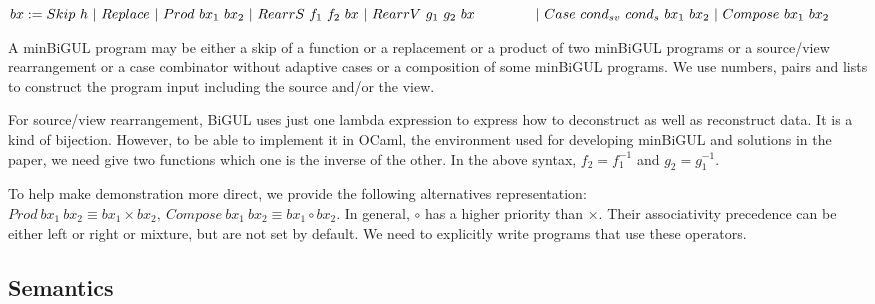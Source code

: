     $bx := Skip \ h \
        | \ Replace \
        | \ Prod \ bx_1 \ bx_2 \
        | \ RearrS \ f_1 \ f_2 \ bx \
        | \ RearrV \ g_1 \ g_2 \ bx \\
    \qtabs{2} | \ Case \ cond_{sv} \ cond_{s} \ bx_1 \ bx_2 \
        | \ Compose \ bx_1 \ bx_2$

A minBiGUL program may be either a skip of a function or a replacement or a product of two minBiGUL programs or a source/view rearrangement or a case combinator without adaptive cases or a composition of some minBiGUL programs. We use numbers, pairs and lists to construct the program input including the source and/or the view.

For source/view rearrangement, BiGUL uses just one lambda expression to express how to deconstruct as well as reconstruct data. It is a kind of bijection. However, to be able to implement it in OCaml, the environment used for developing minBiGUL and solutions in the paper, we need give two functions which one is the inverse of the other. In the above syntax, $f_2 = f_1^{-1}$ and $g_2 = g_1^{-1}$.

To help make demonstration more direct, we provide the following alternatives representation: $Prod \ bx_1 \ bx_2 \equiv bx_1 \times bx_2, \ Compose \ bx_1 \ bx_2 \equiv bx_1 \circ bx_2$. In general, $\circ$ has a higher priority than $\times$. Their associativity precedence can be either left or right or mixture, but are not set by default. We need to explicitly write programs that use these operators.

\subsection{Semantics}

